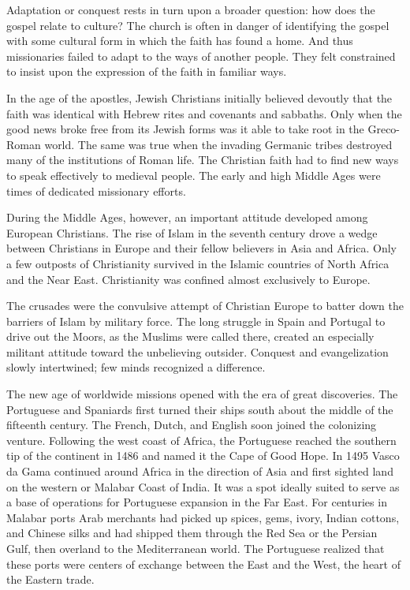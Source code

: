 Adaptation or conquest rests in turn upon a broader question: how does the gospel relate to culture?
The church is often in danger of identifying the gospel with some cultural form in which the faith
has found a home. And thus missionaries failed to adapt to the ways of another people. They felt
constrained to insist upon the expression of the faith in familiar ways.

In the age of the apostles, Jewish Christians initially believed devoutly that the faith was
identical with Hebrew rites and covenants and sabbaths. Only when the good news broke free from its
Jewish forms was it able to take root in the Greco-Roman world. The same was true when the invading
Germanic tribes destroyed many of the institutions of Roman life. The Christian faith had to find
new ways to speak effectively to medieval people. The early and high Middle Ages were times of
dedicated missionary efforts.

During the Middle Ages, however, an important attitude developed among European Christians. The rise
of Islam in the seventh century drove a wedge between Christians in Europe and their fellow
believers in Asia and Africa. Only a few outposts of Christianity survived in the Islamic countries
of North Africa and the Near East. Christianity was confined almost exclusively to Europe.

The crusades were the convulsive attempt of Christian Europe to batter down the barriers of Islam by
military force. The long struggle in Spain and Portugal to drive out the Moors, as the Muslims were
called there, created an especially militant attitude toward the unbelieving outsider. Conquest and
evangelization slowly intertwined; few minds recognized a difference.

The new age of worldwide missions opened with the era of great discoveries. The Portuguese and
Spaniards first turned their ships south about the middle of the fifteenth century. The French,
Dutch, and English soon joined the colonizing venture. Following the west coast of Africa, the
Portuguese reached the southern tip of the continent in 1486 and named it the Cape of Good Hope. In
1495 Vasco da Gama continued around Africa in the direction of Asia and first sighted land on the
western or Malabar Coast of India. It was a spot ideally suited to serve as a base of operations for
Portuguese expansion in the Far East. For centuries in Malabar ports Arab merchants had picked up
spices, gems, ivory, Indian cottons, and Chinese silks and had shipped them through the Red Sea or
the Persian Gulf, then overland to the Mediterranean world. The Portuguese realized that these ports
were centers of exchange between the East and the West, the heart of the Eastern trade.

